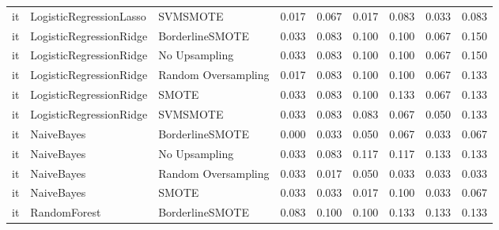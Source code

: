 \begin{tabular}{lllllllll}
      it &      LogisticRegressionLasso &            SVMSMOTE & 0.017 &                     0.067 &                 0.017 &                  0.083 &                                   0.033 &     0.083 \\
      it &      LogisticRegressionRidge &     BorderlineSMOTE & 0.033 &                     0.083 &                 0.100 &                  0.100 &                                   0.067 &     0.150 \\
      it &      LogisticRegressionRidge &       No Upsampling & 0.033 &                     0.083 &                 0.100 &                  0.100 &                                   0.067 &     0.150 \\
      it &      LogisticRegressionRidge & Random Oversampling & 0.017 &                     0.083 &                 0.100 &                  0.100 &                                   0.067 &     0.133 \\
      it &      LogisticRegressionRidge &               SMOTE & 0.033 &                     0.083 &                 0.100 &                  0.133 &                                   0.067 &     0.133 \\
      it &      LogisticRegressionRidge &            SVMSMOTE & 0.033 &                     0.083 &                 0.083 &                  0.067 &                                   0.050 &     0.133 \\
      it &                   NaiveBayes &     BorderlineSMOTE & 0.000 &                     0.033 &                 0.050 &                  0.067 &                                   0.033 &     0.067 \\
      it &                   NaiveBayes &       No Upsampling & 0.033 &                     0.083 &                 0.117 &                  0.117 &                                   0.133 &     0.133 \\
      it &                   NaiveBayes & Random Oversampling & 0.033 &                     0.017 &                 0.050 &                  0.033 &                                   0.033 &     0.033 \\
      it &                   NaiveBayes &               SMOTE & 0.033 &                     0.033 &                 0.017 &                  0.100 &                                   0.033 &     0.067 \\
      it &                 RandomForest &     BorderlineSMOTE & 0.083 &                     0.100 &                 0.100 &                  0.133 &                                   0.133 &     0.133 \\

\end{tabular}
